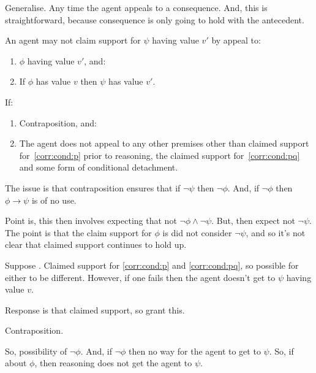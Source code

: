 \begin{note}
  Generalise.
  Any time the agent appeals to a consequence.
  And, this is straightforward, because consequence is only going to hold with the antecedent.

  \begin{corollary}\label{corr:eiS:C:contraposition}
    An agent may not claim support for \(\psi\) having value \(v'\) by appeal to:
    \begin{enumerate}[label=\arabic*., ref=(\arabic*)]
    \item\label{corr:cond:p} \(\phi\) having value \(v'\), and:
    \item\label{corr:cond:pq} If \(\phi\) has value \(v\) then \(\psi\) has value \(v'\).
    \end{enumerate}
    If:
    \begin{enumerate}[resume]
    \item Contraposition, and:
    \item The agent does not appeal to any other premises other than claimed support for~\ref{corr:cond:p} prior to reasoning, the claimed support for~\ref{corr:cond:pq} and some form of conditional detachment.
    \end{enumerate}
    \vspace{-\baselineskip}
  \end{corollary}

  {
    \color{red}
    The issue is that contraposition ensures that if \(\lnot\psi\) then \(\lnot\phi\).
    And, if \(\lnot\phi\) then \(\phi \rightarrow \psi\) is of no use.

    Point is, this then involves expecting that not \(\lnot\phi \land \lnot\psi\).
    But, then expect not \(\lnot\psi\).
    The point is that the claim support for \(\phi\) is did not consider \(\lnot\psi\), and so it's not clear that claimed support continues to hold up.
  }

  Suppose \mistaken{}.
  Claimed support for \ref{corr:cond:p} and \ref{corr:cond:pq}, so possible for either to be different.
  However, if one fails then the agent doesn't get to \(\psi\) having value \(v\).

  Response is that claimed support, so grant this.

  Contraposition.

  So, possibility of \(\lnot\phi\).
  And, if \(\lnot\phi\) then no way for the agent to get to \(\psi\).
  So, if \misled{} about \(\phi\), then reasoning does not get the agent to \(\psi\).


\end{note}
